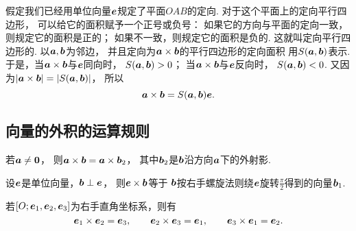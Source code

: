 假定我们已经用单位向量\(\boldsymbol{e}\)规定了平面\(OAB\)的定向.
对于这个平面上的定向平行四边形，
可以给它的面积赋予一个正号或负号：
如果它的方向与平面的定向一致，则规定它的面积是正的；
如果不一致，则规定它的面积是负的.
这就叫定向平行四边形的.
以\(\boldsymbol{a},\boldsymbol{b}\)为邻边，
并且定向为\(\boldsymbol{a}\times\boldsymbol{b}\)的平行四边形的定向面积
用\(S(\boldsymbol{a},\boldsymbol{b})\)表示.
于是，当\(\boldsymbol{a}\times\boldsymbol{b}\)与\(\boldsymbol{e}\)同向时，
\(S(\boldsymbol{a},\boldsymbol{b}) > 0\)；
当\(\boldsymbol{a}\times\boldsymbol{b}\)与\(\boldsymbol{e}\)反向时，
\(S(\boldsymbol{a},\boldsymbol{b}) < 0\).
又因为\(
	\abs{\boldsymbol{a}\times\boldsymbol{b}}
	= \abs{S(\boldsymbol{a},\boldsymbol{b})}
\)，
所以\begin{equation}\label{equation:解析几何.向量外积与定向平行四边形的定向面积之间的关系}
	\boldsymbol{a}\times\boldsymbol{b}
	= S(\boldsymbol{a},\boldsymbol{b})
	\boldsymbol{e}.
\end{equation}

\subsection{向量的外积的运算规则}
\begin{theorem}
若\(\boldsymbol{a}\neq\boldsymbol{0}\)，
则\(\boldsymbol{a}\times\boldsymbol{b}=\boldsymbol{a}\times\boldsymbol{b}_2\)，
其中\(\boldsymbol{b}_2\)是\(\boldsymbol{b}\)沿方向\(\boldsymbol{a}\)下的外射影.
\end{theorem}

\begin{theorem}
设\(\boldsymbol{e}\)是单位向量，\(\boldsymbol{b}\perp\boldsymbol{e}\)，
则\(\boldsymbol{e}\times\boldsymbol{b}\)等于
\(\boldsymbol{b}\)按右手螺旋法则绕\(\boldsymbol{e}\)旋转\(\frac{\pi}{2}\)得到的向量\(\boldsymbol{b}_1\).
\end{theorem}

\begin{corollary}
若\([O;\boldsymbol{e}_1,\boldsymbol{e}_2,\boldsymbol{e}_3]\)为右手直角坐标系，则有\begin{equation*}
	\boldsymbol{e}_1\times\boldsymbol{e}_2 = \boldsymbol{e}_3, \qquad
	\boldsymbol{e}_2\times\boldsymbol{e}_3 = \boldsymbol{e}_1, \qquad
	\boldsymbol{e}_3\times\boldsymbol{e}_1 = \boldsymbol{e}_2.
\end{equation*}
\end{corollary}

